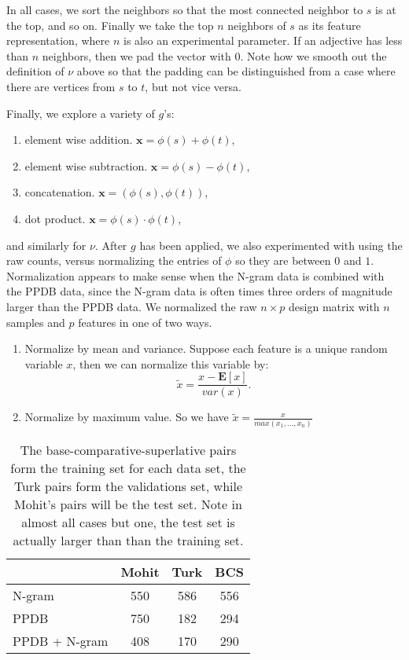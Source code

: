 In all cases, we sort the neighbors so that the most connected neighbor to $s$ is at the top, and so on. Finally we take the top $n$ neighbors of $s$ as its feature representation, where $n$ is also an experimental parameter. If an adjective has less than $n$ neighbors, then we pad the vector with $0$. Note how we smooth out the definition of $\nu$ above so that the padding can be distinguished from a case where there are vertices from $s$ to $t$, but not vice versa.

Finally, we explore a variety of $g$'s:

\begin{enumerate}
	\item element wise addition. $\pmb{x} = \phi(s) + \phi(t)$,
	\item element wise subtraction. $\pmb{x} = \phi(s) - \phi(t)$,
	\item concatenation. $\pmb{x} = (\phi(s), \phi(t))$,
	\item dot product. $\pmb{x} = \phi(s) \cdot \phi(t)$,
\end{enumerate}

and similarly for $\nu$. After $g$ has been applied, we also experimented with using the raw counts, versus normalizing the entries of $\phi$ so they are between $0$ and $1$. Normalization appears to make sense when the N-gram data is combined with the PPDB data, since the N-gram data is often times three orders of magnitude larger than the PPDB data. We normalized the raw $n \times p$ design matrix with $n$ samples and $p$ features in one of two ways.

\begin{enumerate}
	\item Normalize by mean and variance. Suppose each feature is a unique random variable $x$, then we can normalize this variable by:
		\[	
			\tilde{x} = \frac{x - \pmb{E}[x]}{var(x)}.
		\]
	\item Normalize by maximum value. So we have $\tilde{x} = \frac{x}{max(x_1,\ldots,x_n)}$
\end{enumerate}


\begin{table}
\small
\centering
\begin{tabular}{|l|c|c|c|}
	\hline 
	& \multicolumn{1}{c|}{Mohit} 
	& \multicolumn{1}{c|}{Turk} 
	& \multicolumn{1}{c|}{BCS} \\
	\hline 
	N-gram          & 550 & 586 & 556 \\
	PPDB            & 750 & 182 & 294 \\
	PPDB + N-gram   & 408 & 170 & 290 \\
	\hline
\end{tabular}
\caption{\label{font-table} The base-comparative-superlative pairs form the training set for each data set, the Turk pairs form the validations set, while Mohit's pairs will be the test set. Note in almost all cases but one, the test set is actually larger than than the training set. }
\end{table}



